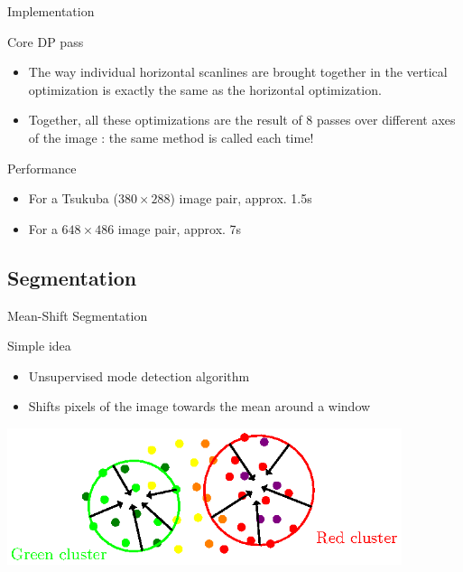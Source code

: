 \documentclass[12pt]{beamer}
\begin{document}
\begin{frame}{Implementation}
  \begin{block}{Core DP pass}
    \begin{itemize}
      \item The way individual horizontal scanlines are brought together in the vertical optimization is exactly the same as the horizontal optimization.
      \item Together, all these optimizations are the result of 8 passes over different axes of the image : the same method is called each time!
    \end{itemize}
  \end{block}

  \begin{block}{Performance}
    \begin{itemize}
      \item For a Tsukuba ($380 \times 288$) image pair, approx. 1.5s
      \item For a $648 \times 486$ image pair, approx. 7s
    \end{itemize}
  \end{block}
\end{frame}

\subsection{Segmentation}

\begin{frame}{Mean-Shift Segmentation}
  \begin{block}{Simple idea}
    \begin{itemize}
      \item Unsupervised mode detection algorithm
      \item Shifts pixels of the image towards the mean around a window
    \end{itemize}
  \end{block}

  \begin{center}
    \includegraphics[height=4cm]{graphics/segmentation-meanshift.eps}
  \end{center}
\end{frame}
\end{document}
